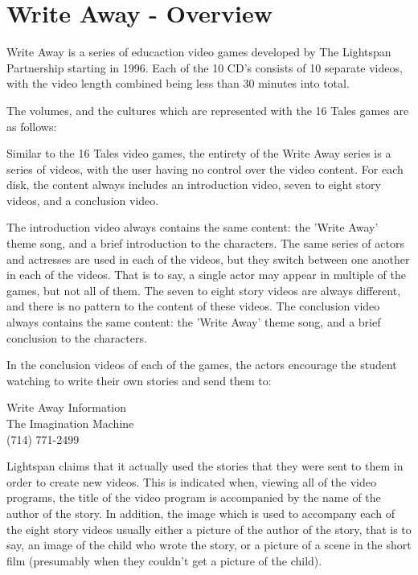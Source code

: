 \chapter{Write Away - Overview}

Write Away is a series of educaction video games developed by The Lightspan Partnership starting in 1996.
Each of the 10 CD's consists of 10 separate videos, with the video length combined being less than 30 minutes into total.

The volumes, and the cultures which are represented with the 16 Tales games are as follows:

Similar to the 16 Tales video games, the entirety of the Write Away series is a series of videos, with the user having no control over the video content.
For each disk, the content always includes an introduction video, seven to eight story videos, and a conclusion video.

The introduction video always contains the same content: the 'Write Away' theme song, and a brief introduction to the characters.
The same series of actors and actresses are used in each of the videos, but they switch between one another in each of the videos.
That is to say, a single actor may appear in multiple of the games, but not all of them.
The seven to eight story videos are always different, and there is no pattern to the content of these videos.
The conclusion video always contains the same content: the 'Write Away' theme song, and a brief conclusion to the characters.

In the conclusion videos of each of the games, the actors encourage the student watching to write their own stories and send them to:

\begin{center}
    Write Away Information\\
    The Imagination Machine\\
    (714) 771-2499
\end{center}

Lightspan claims that it actually used the stories that they were sent to them in order to create new videos.
This is indicated when, viewing all of the video programs, the title of the video program is accompanied by the name of the author of the story.
In addition, the image which is used to accompany each of the eight story videos usually either a picture of the author of the story, that is to say, an image of the child who wrote the story, or a picture of a scene in the short film (presumably when they couldn't get a picture of the child).


